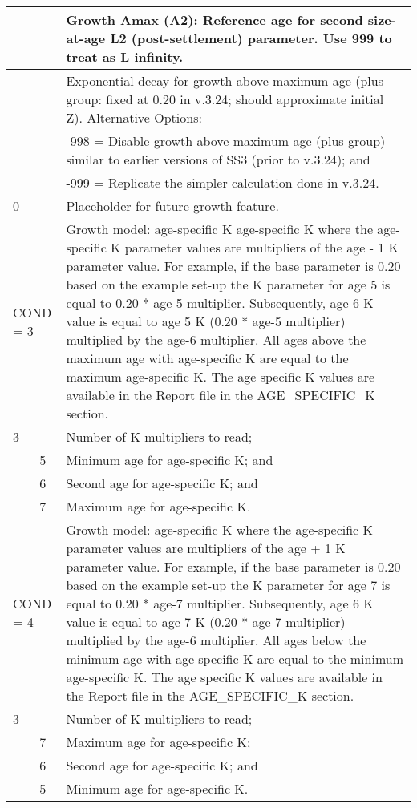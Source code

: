 \begin{longtable}{p{0.5cm} p{2cm} p{12.5cm}}
	\Tstrut 25 & & Growth Amax (A2): Reference age for second size-at-age L2 (post-settlement) parameter. Use 999 to treat as L infinity. \Bstrut\\
	\hline
	
	\Tstrut 0.20 & & Exponential decay for growth above maximum age (plus group: fixed at 0.20 in v.3.24; should approximate initial Z). Alternative Options: \\
				 & & -998 = Disable growth above maximum age (plus group) similar to earlier versions of SS3 (prior to v.3.24); and \\
				 & & -999 = Replicate the simpler calculation done in v.3.24. \Bstrut\\
	\hline
	
	0 & & Placeholder for future growth feature. \Tstrut\Bstrut\\
	\hline

	\multicolumn{2}{l}{COND = 3} & Growth model: age-specific K age-specific K where the age-specific K parameter values are multipliers of the age - 1 K parameter value. For example, if the base parameter is 0.20 based on the example set-up the K parameter for age 5 is equal to 0.20 * age-5 multiplier. Subsequently, age 6 K value is equal to age 5 K (0.20 * age-5 multiplier) multiplied by the age-6 multiplier. All ages above the maximum age with age-specific K are equal to the maximum age-specific K. The age specific K values are available in the Report file in the AGE\_SPECIFIC\_K section.\Tstrut\\
	3 & & Number of K multipliers to read; \\
	& 5 & Minimum age for age-specific K; and \\
	& 6 & Second age for age-specific K; and \\
	& 7 & Maximum age for age-specific K. \Bstrut\\
	
	\multicolumn{2}{l}{COND = 4} & Growth model: age-specific K where the age-specific K parameter values are multipliers of the age + 1 K parameter value. For example, if the base parameter is 0.20 based on the example set-up the K parameter for age 7 is equal to 0.20 * age-7 multiplier. Subsequently, age 6 K value is equal to age 7 K (0.20 * age-7 multiplier) multiplied by the age-6 multiplier. All ages below the minimum age with age-specific K are equal to the minimum age-specific K. The age specific K values are available in the Report file in the AGE\_SPECIFIC\_K section. \Tstrut\\
	3 & & Number of K multipliers to read; \\
	  & 7 & Maximum age for age-specific K; \\
	  & 6 & Second age for age-specific K; and \\
	  & 5 & Minimum age for age-specific K. \Bstrut\\
	\hline
	

\end{longtable}
